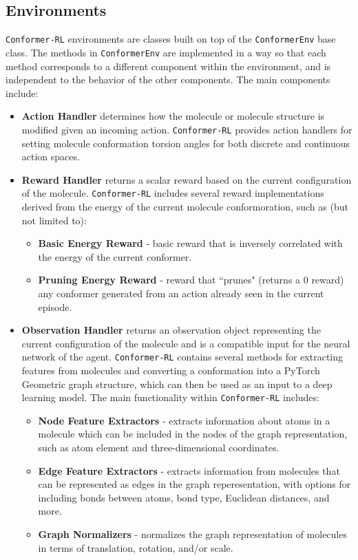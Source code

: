 \documentclass[twoside,11pt]{article}
\newcommand{\code}[1]{\texttt{#1}}
\newcommand{\titleofpaper}{Conformer-RL}
\begin{document}
\subsection{Environments}
\code{\titleofpaper} environments are classes built on top of the \code{ConformerEnv} base class. The methods in \code{ConformerEnv} are implemented in a way so that each method corresponds to a different component within the environment, and is independent to the behavior of the other components. The main components include:
\begin{itemize}
  \item \textbf{Action Handler} determines how the molecule or molecule structure is modified given an incoming action. \code{\titleofpaper} provides action handlers for setting molecule conformation torsion angles for both discrete and continuous action spaces.
  
  \item \textbf{Reward Handler} returns a scalar reward based on the current configuration of the molecule. \code{\titleofpaper} includes several reward implementations derived from the energy of the current molecule conformoration, such as (but not limited to):
  \begin{itemize}
    \item \textbf{Basic Energy Reward} - basic reward that is inversely correlated with the energy of the current conformer.
    \item \textbf{Pruning Energy Reward} - reward that ``prunes" (returns a 0 reward) any conformer generated from an action already seen in the current episode.
  \end{itemize}

  \item \textbf{Observation Handler} returns an observation object representing the current configuration of the molecule and is a compatible input for the neural network of the agent. \code{\titleofpaper} contains several methods for extracting features from molecules and converting a conformation into a PyTorch Geometric graph structure, which can then be used as an input to a deep learning model. The main functionality within \code{\titleofpaper} includes:
  \begin{itemize}
    \item \textbf{Node Feature Extractors} - extracts information about atoms in a molecule which can be included in the nodes of the graph representation, such as atom element and three-dimensional coordinates.
    \item \textbf{Edge Feature Extractors} - extracts information from molecules that can be represented as edges in the graph reperesentation, with options for including bonds between atoms, bond type, Euclidean distances, and more.
    \item \textbf{Graph Normalizers} - normalizes the graph representation of molecules in terms of translation, rotation, and/or scale.
  \end{itemize}


\end{itemize}
\end{document}
